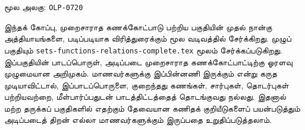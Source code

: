 \documentclass[11pt,a4paper,openany]{memoir}
\makeatletter
\newcommand\TADriverHeadingMode{\def\ol@chaptercs{section}\def\ol@partcs{section}}
\makeatother
\begin{document}










\OLEndChapterHook



\endgroup

\clearpage
\noindent மூல அலகு: \texttt{OLP-0720}\par
\begingroup
\TADriverHeadingMode
{}




\begin{editorial}
இந்தக் கோப்பு, முறைசாராத கணக்கோட்பாடு பற்றிய பகுதியின்
முதல் நான்கு அத்தியாயங்களை, படிப்படியாக விரித்துரைக்கும்
மூல வடிவத்தில் சேர்க்கிறது. முழுப் பகுதியும்
\verb|sets-functions-relations-complete.tex| மூலம் சேர்க்கப்படுகிறது.
இப்பகுதியின் பாடப்பொருள், அடிப்படை முறைசாராத கணக்கோட்பாட்டிற்கு
ஓரளவு முழுமையான அறிமுகம். மாணவர்களுக்கு இப்பின்னணி
இருக்கும் என்று கருத முடியாவிட்டால், இப்பாடப்பொருளை,
குறைந்தது கணங்கள், சார்புகள், தொடர்புகள் பற்றியவற்றை,
மீள்பார்ப்பதுடன் பாடத்திட்டத்தைத் தொடங்குவது நல்லது.
இதனால் மற்ற தருக்கப் பகுதிகளில் எதற்கும் தேவையான
கணிதக் குறியீடுகளைப் பயன்படுத்தும் அடிப்படைத் திறன்
எல்லா மாணவர்களுக்கும் இருப்பதை உறுதிப்படுத்தலாம்.
\end{editorial}



\end{document}
